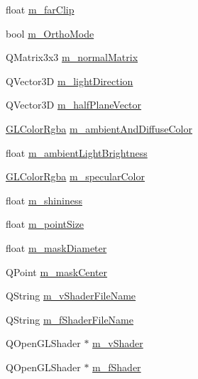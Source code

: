 \begin{DoxyCompactItemize}
float \mbox{\hyperlink{class_g_l_e_s_renderer_a6ecd1dee12a4592f35d097e14f90933b}{m\+\_\+far\+Clip}}
\item 
bool \mbox{\hyperlink{class_g_l_e_s_renderer_a78662dcb0fedf7710a57345d3d684b85}{m\+\_\+\+Ortho\+Mode}}
\item 
Q\+Matrix3x3 \mbox{\hyperlink{class_g_l_e_s_renderer_a76ff9b2803ac2a897d9df0cf587601ed}{m\+\_\+normal\+Matrix}}
\item 
Q\+Vector3D \mbox{\hyperlink{class_g_l_e_s_renderer_a7347241a0f6482d69479d10848c70238}{m\+\_\+light\+Direction}}
\item 
Q\+Vector3D \mbox{\hyperlink{class_g_l_e_s_renderer_ae3feaa98657e57bbc795a845dfafe1fe}{m\+\_\+half\+Plane\+Vector}}
\item 
\mbox{\hyperlink{class_g_l_color_rgba}{G\+L\+Color\+Rgba}} \mbox{\hyperlink{class_g_l_e_s_renderer_af4b3fcfa029b28bfdd9d2b7bb9202796}{m\+\_\+ambient\+And\+Diffuse\+Color}}
\item 
float \mbox{\hyperlink{class_g_l_e_s_renderer_ad40448fd0cbb01b078a759e5f8d9debc}{m\+\_\+ambient\+Light\+Brightness}}
\item 
\mbox{\hyperlink{class_g_l_color_rgba}{G\+L\+Color\+Rgba}} \mbox{\hyperlink{class_g_l_e_s_renderer_a58ff6c2e940d9cb7fb8bdf9e676f69cd}{m\+\_\+specular\+Color}}
\item 
float \mbox{\hyperlink{class_g_l_e_s_renderer_a5cb19e8d00b558a84f3776d51f0aca9c}{m\+\_\+shininess}}
\item 
float \mbox{\hyperlink{class_g_l_e_s_renderer_a8571248c1e8858ccd260d91497e13354}{m\+\_\+point\+Size}}
\item 
float \mbox{\hyperlink{class_g_l_e_s_renderer_a8657f5ff8c5f663cd043731e9753e70a}{m\+\_\+mask\+Diameter}}
\item 
Q\+Point \mbox{\hyperlink{class_g_l_e_s_renderer_a4251b608f7c887b2bcfcb421b4a793c5}{m\+\_\+mask\+Center}}
\item 
Q\+String \mbox{\hyperlink{class_g_l_e_s_renderer_a9f9222c1a54ff9b01edb609bb570151a}{m\+\_\+v\+Shader\+File\+Name}}
\item 
Q\+String \mbox{\hyperlink{class_g_l_e_s_renderer_ac876ef67f2795f17e0f1d1e43cb686b4}{m\+\_\+f\+Shader\+File\+Name}}
\item 
Q\+Open\+G\+L\+Shader $\ast$ \mbox{\hyperlink{class_g_l_e_s_renderer_a41916fc04d753007a9340065ab08762e}{m\+\_\+v\+Shader}}
\item 
Q\+Open\+G\+L\+Shader $\ast$ \mbox{\hyperlink{class_g_l_e_s_renderer_a63dd17ddf099e24a26a9d7cdeab664fa}{m\+\_\+f\+Shader}}
\item 

\end{DoxyCompactItemize}
